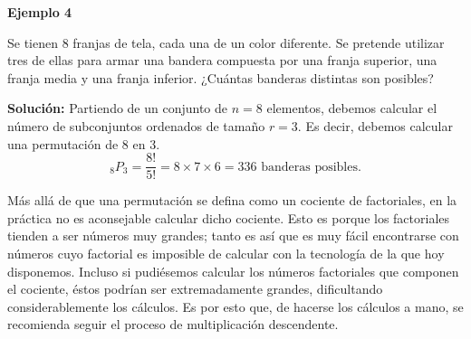 \documentclass[
  letterpaper,
  DIV=11,
  numbers=noendperiod]{scrreprt}
\begin{document}
\begin{examplebox}

\begin{center}
\textbf{Ejemplo 4}

\end{center}

Se tienen 8 franjas de tela, cada una de un color diferente. Se pretende
utilizar tres de ellas para armar una bandera compuesta por una franja
superior, una franja media y una franja inferior. ¿Cuántas banderas
distintas son posibles?

\textbf{Solución:} Partiendo de un conjunto de \(n=8\) elementos,
debemos calcular el número de subconjuntos ordenados de tamaño \(r=3\).
Es decir, debemos calcular una permutación de 8 en 3.
\[_8P_3 = \frac{8!}{5!} = 8 \times 7 \times 6 = 336 \text{ banderas posibles.}\]

\end{examplebox}

\begin{tcolorbox}[enhanced jigsaw, opacitybacktitle=0.6, breakable, toptitle=1mm, toprule=.15mm, colback=white, coltitle=black, leftrule=.75mm, colframe=quarto-callout-warning-color-frame, left=2mm, opacityback=0, bottomrule=.15mm, arc=.35mm, colbacktitle=quarto-callout-warning-color!10!white, bottomtitle=1mm, titlerule=0mm, title=\textcolor{quarto-callout-warning-color}{\faExclamationTriangle}\hspace{0.5em}{Advertencia}, rightrule=.15mm]

Más allá de que una permutación se defina como un cociente de
factoriales, en la práctica no es aconsejable calcular dicho cociente.
Esto es porque los factoriales tienden a ser números muy grandes; tanto
es así que es muy fácil encontrarse con números cuyo factorial es
imposible de calcular con la tecnología de la que hoy
disponemos.\footnotemark{} Incluso si pudiésemos calcular los números
factoriales que componen el cociente, éstos podrían ser extremadamente
grandes, dificultando considerablemente los cálculos. \footnotemark{} Es
por esto que, de hacerse los cálculos a mano, se recomienda seguir el
proceso de multiplicación descendente.

\end{tcolorbox}


\end{document}
